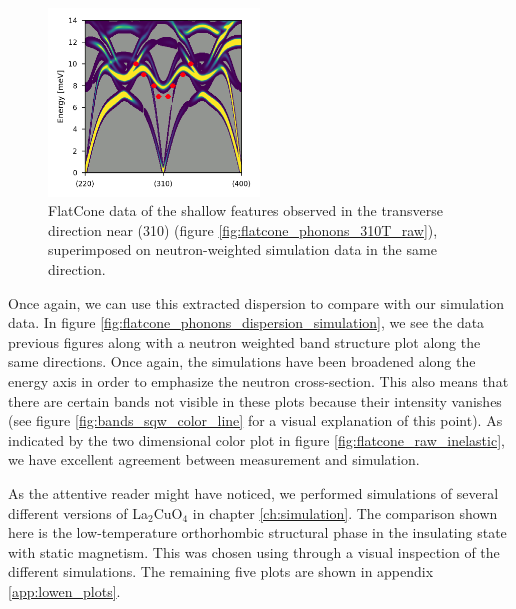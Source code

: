 \begin{figure}
    \centering
    \includegraphics[width=0.5\textwidth]{fig/lowen/flatcone_fits_simulation_310T.png}
    \caption{FlatCone data of the shallow features observed in the transverse direction near (310) (figure \ref{fig:flatcone_phonons_310T_raw}), superimposed on neutron-weighted simulation data in the same direction.}
    \label{fig:flatcone_phonons_310T_sim}
\end{figure}

Once again, we can use this extracted dispersion to compare with our simulation data. In figure \ref{fig:flatcone_phonons_dispersion_simulation}, we see the data previous figures along with a neutron weighted band structure plot along the same directions. Once again, the simulations have been broadened along the energy axis in order to emphasize the neutron cross-section. This also means that there are certain bands not visible in these plots because their intensity vanishes (see figure \ref{fig:bands_sqw_color_line} for a visual explanation of this point). As indicated by the two dimensional color plot in figure \ref{fig:flatcone_raw_inelastic}, we have excellent agreement between measurement and simulation.

As the attentive reader might have noticed, we performed simulations of several different versions of La$_2$CuO$_4$ in chapter \ref{ch:simulation}. The comparison shown here is the low-temperature orthorhombic structural phase in the insulating state with static magnetism. This was chosen using through a visual inspection of the different simulations. The remaining five plots are shown in appendix \ref{app:lowen_plots}.

